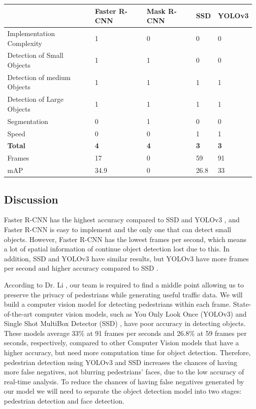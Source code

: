 \documentclass[onecolumn, draftclsnofoot,10pt, compsoc]{IEEEtran}
\begin{document}
\begin{center}
\begin{tabular}{|l|l|l|l|l|}
\hline
           & \textbf{Faster R-CNN} & \textbf{Mask R-CNN} & \textbf{SSD} & \textbf{YOLOv3} \\ \hline
Implementation Complexity &      1     &     0 &     0            &     0      \\ \hline
Detection of Small Objects &     1     &     1 &     0       &    0       \\ \hline
Detection of medium Objects &     1     &     1 &     1       &    1       \\ \hline
Detection of Large Objects &      1     &     1 &     1     &     1      \\ \hline
Segmentation &      0     &     1 &     0     &     0      \\ \hline
Speed &     0      &     0 &      1     &      1    \\ \hline
\textbf{Total} &      \textbf{4}     &     \textbf{4} &   \textbf{3}        &      \textbf{3}     \\ \hline
Frames &     17      &     0 &      59     &      91    \\ \hline
mAP &     34.9     &     0 &     26.8      &      33       \\
\hline
\end{tabular}
\end{center}

\subsection{Discussion}
Faster R-CNN \cite{fasterrcnn} has the highest accuracy compared to SSD \cite{SSD} and YOLOv3 \cite{YOLOv3}, and Faster R-CNN is easy to implement and the only one that can detect small objects. However, Faster R-CNN has the lowest frames per second, which means a lot of spatial information of continue object detection lost due to this. In addition, SSD and YOLOv3 have similar results, but YOLOv3 have more frames per second and higher accuracy compared to SSD \cite{pda1} \cite{pda2} \cite{pda3}.

According to Dr. Li \cite{li}, our team is required to find a middle point allowing us to preserve the privacy of pedestrians while generating useful traffic data. We will build a computer vision model for detecting pedestrians within each frame. State-of-the-art computer vision models, such as You Only Look Once (YOLOv3) \cite{YOLOv3} and Single Shot MultiBox Detector (SSD) \cite{SSD}, have poor accuracy in detecting objects. These models average 33\% at 91 frames per seconds and 26.8\% at 59 frames per seconds, respectively, compared to other Computer Vision models that have a higher accuracy, but need more computation time for object detection. Therefore, pedestrian detection using YOLOv3 and SSD increases the chances of having more false negatives, not blurring pedestrians' faces, due to the low accuracy of real-time analysis. To reduce the chances of having false negatives generated by our model we will need to separate the object detection model into two stages: pedestrian detection and face detection.
\end{document}
